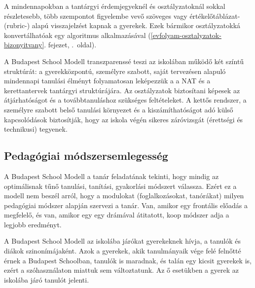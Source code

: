 A mindennapokban a tantárgyi érdemjegyeknél és osztályzatoknál\break
sokkal
részletesebb, több szempontot figyelembe vevő szöveges vagy
ér\-té\-ke\-lő\-táb\-lá\-zat- (rubric-) alapú visszajelzést kapnak a gyerekek. Ezek
bármikor
osztályzatokká konvertálhatóak egy algoritmus alkalmazásával
(\ref{evfolyam-osztalyzatok-bizonyitvany}. fejezet, \pageref{evfolyam-osztalyzatok-bizonyitvany}.~oldal).

A Budapest School Modell transzparenssé teszi az iskolában működő két
színtű struktúrát: a gyerekközpontú, személyre szabott, saját tervezésen
alapuló mindennapi tanulási élményt folyamatosan leképezzük a a NAT és a
kerettantervek tantárgyi struktúrájára. Az osztályzatok biztosítani
képesek az átjárhatóságot és a továbbtanuláshoz szükséges feltételeket.
A kettős rendszer, a személyre szabott belső tanulási környezet és a
kiszámíthatóságot adó külső kapcsolódások biztosítják, hogy az iskola
végén sikeres záróvizsgát (érettségi és technikusi) tegyenek.

\hypertarget{pedagogiai-modszersemlegesseg}{%
\subsection{Pedagógiai
módszersemlegesség}\label{pedagogiai-modszersemlegesseg}}

A Budapest School Modell a tanár feladatának tekinti, hogy mindig az
optimálisnak tűnő tanulási, tanítási, gyakorlási módszert válassza.
Ezért ez a modell nem beszél arról, hogy a modulokat (foglalkozásokat,
tanórákat) milyen pedagógiai módszer alapján szervezi a tanár. Van,
amikor egy frontális előadás a megfelelő, és van, amikor egy egy
drámával átitatott, koop módszer adja a legjobb eredményt.

A Budapest School Modell az iskolába járókat gyerekeknek hívja, a
tanulók és diákok szinonímájaként. Azok a gyerekek, akik tanulmányaik
vége felé felnőtté érnek a Budapest Schoolban, tanulók is maradnak, és
talán egy kicsit gyerekek is, ezért a szóhasználaton miattuk sem
változtatunk. Az ő esetükben a gyerek az iskolába járó tanulót jelenti.
